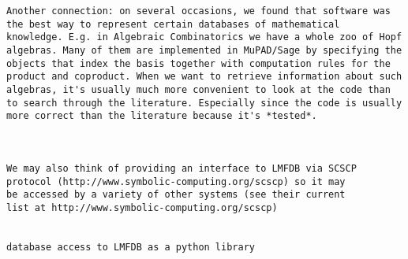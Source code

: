 \begin{Workpackage}{\thewpno}
\begin{verbatim}
Another connection: on several occasions, we found that software was
the best way to represent certain databases of mathematical
knowledge. E.g. in Algebraic Combinatorics we have a whole zoo of Hopf
algebras. Many of them are implemented in MuPAD/Sage by specifying the
objects that index the basis together with computation rules for the
product and coproduct. When we want to retrieve information about such
algebras, it's usually much more convenient to look at the code than
to search through the literature. Especially since the code is usually
more correct than the literature because it's *tested*.



We may also think of providing an interface to LMFDB via SCSCP
protocol (http://www.symbolic-computing.org/scscp) so it may
be accessed by a variety of other systems (see their current
list at http://www.symbolic-computing.org/scscp)


database access to LMFDB as a python library


\end{verbatim}
\end{Workpackage}
